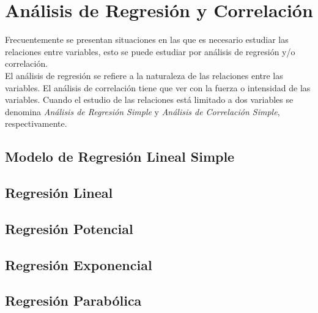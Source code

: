 \chapter{Análisis de Regresión y Correlación}
Frecuentemente se presentan situaciones en las que es necesario estudiar las relaciones entre variables, esto se puede estudiar por análisis de regresión y/o correlación.
\\$ { } $\\
El análisis de regresión se refiere a la naturaleza de las relaciones entre las variables. El análisis de correlación tiene que ver con la fuerza o intensidad de las variables. Cuando el estudio de las relaciones está limitado a dos variables se denomina \textit{Análisis de Regresión Simple} y \textit{Análisis de Correlación Simple}, respectivamente.
\section{Modelo de Regresión Lineal Simple}
\section{Regresión Lineal}
\section{Regresión Potencial}
\section{Regresión Exponencial}
\section{Regresión Parabólica}